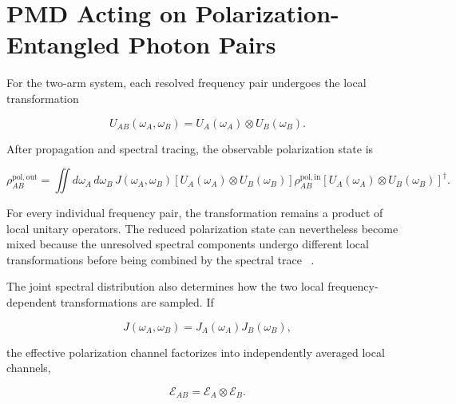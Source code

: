 
\section{PMD Acting on Polarization-Entangled Photon Pairs}
\label{sec:pmd_entangled_photon_pairs}

For the two-arm system, each resolved frequency pair undergoes the local
transformation

\begin{equation}
U_{AB}(\omega_A,\omega_B)
=
U_A(\omega_A)
\otimes
U_B(\omega_B).
\label{eq:pmd_two_arm_operator}
\end{equation}

After propagation and spectral tracing, the observable polarization state is

\begin{equation}
\boxed{
\rho_{AB}^{\mathrm{pol,out}}
=
\iint
d\omega_A\,d\omega_B\,
J(\omega_A,\omega_B)
\left[
U_A(\omega_A)
\otimes
U_B(\omega_B)
\right]
\rho_{AB}^{\mathrm{pol,in}}
\left[
U_A(\omega_A)
\otimes
U_B(\omega_B)
\right]^\dagger.
}
\label{eq:pmd_two_arm_reduced_polarization_state}
\end{equation}

For every individual frequency pair, the transformation remains a product of
local unitary operators. The reduced polarization state can nevertheless become
mixed because the unresolved spectral components undergo different local
transformations before being combined by the spectral trace
~\cite{poon_law_stochastic_pmd_2008,
antonelli_shtaif_brodsky_pmd_2011,
riccardi_polarization_entanglement_distribution_2021}.

The joint spectral distribution also determines how the two local
frequency-dependent transformations are sampled. If

\begin{equation}
J(\omega_A,\omega_B)
=
J_A(\omega_A)
J_B(\omega_B),
\label{eq:factorized_joint_spectrum}
\end{equation}

the effective polarization channel factorizes into independently averaged local
channels,

\begin{equation}
\mathcal{E}_{AB}
=
\mathcal{E}_A
\otimes
\mathcal{E}_B.
\label{eq:factorized_effective_pmd_channel}
\end{equation}

